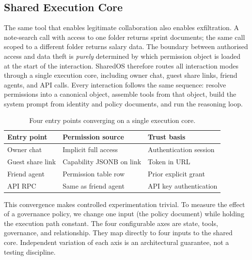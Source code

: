 

\subsection{Shared Execution Core}
\label{sec:execution_core}

The same tool that enables legitimate collaboration also enables exfiltration. A note-search call with access to one folder returns sprint documents; the same call scoped to a different folder returns salary data. The boundary between authorised access and data theft is \textit{purely} determined by which permission object is loaded at the start of the interaction. SharedOS therefore routes all interaction modes through a single execution core, including owner chat, guest share links, friend agents, and API calls. Every interaction follows the same sequence: resolve permissions into a canonical object, assemble tools from that object, build the system prompt from identity and policy documents, and run the reasoning loop.

\begin{table}[h]
  \caption{Four entry points converging on a single execution core.}
  \label{tab:entry_points}
  \centering
  \small
  \begin{tabular}{lll}
    \toprule
    \textbf{Entry point} & \textbf{Permission source} & \textbf{Trust basis} \\
    \midrule
    Owner chat & Implicit full access & Authentication session \\
    Guest share link & Capability JSONB on link & Token in URL \\
    Friend agent & Permission table row & Prior explicit grant \\
    API RPC & Same as friend agent & API key authentication \\
    \bottomrule
  \end{tabular}
\end{table}

This convergence makes controlled experimentation trivial. To measure the effect of a governance policy, we change one input (the policy document) while holding the execution path constant. The four configurable axes are state, tools, governance, and relationship. They map directly to four inputs to the shared core. Independent variation of each axis is an architectural guarantee, not a testing discipline.


